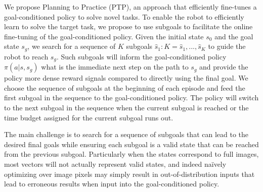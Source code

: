 We propose Planning to Practice (PTP), an approach that efficiently fine-tunes a goal-conditioned policy to solve novel tasks.  
To enable the robot to efficiently learn to solve the target task, we propose to use subgoals to facilitate the online fine-tuning of the goal-conditioned policy. Given the initial state $s_0$ and the goal state $s_g$, we search for a sequence of $K$ subgoals $\hat{s}_1:K = \hat{s}_1, ..., \hat{s}_K$ to guide the robot to reach $s_g$. Such subgoals will inform the goal-conditioned policy $\pi(a | s, s_g)$ what is the immediate next step on the path to $s_g$ and provide the policy more dense reward signals compared to directly using the final goal. We choose the sequence of subgoals at the beginning of each episode and feed the first subgoal in the sequence to the goal-conditioned policy. The policy will switch to the next subgoal in the sequence when the current subgoal is reached or the time budget assigned for the current subgoal runs out.

The main challenge is to search for a sequence of subgoals that can lead to the desired final goals while ensuring each subgoal is a valid state that can be reached from the previous subgoal. Particularly when the states correspond to full images, most vectors will not actually represent valid states, and indeed na\"{i}vely optimizing over image pixels may simply result in out-of-distribution inputs that lead to erroneous results when input into the goal-conditioned policy.


